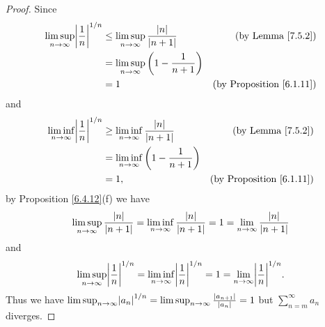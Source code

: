 \begin{proof}
    Since
    \begin{align*}
        \limsup_{n \to \infty} \abs*{\frac{1}{n}}^{1 / n} & \leq \limsup_{n \to \infty} \frac{\abs*{n}}{\abs*{n + 1}} & \text{(by Lemma \ref{7.5.2})}        \\
                                                          & = \limsup_{n \to \infty} \bigg(1 - \frac{1}{n + 1}\bigg)                                         \\
                                                          & = 1                                                       & \text{(by Proposition \ref{6.1.11})}
    \end{align*}
    and
    \begin{align*}
        \liminf_{n \to \infty} \abs*{\frac{1}{n}}^{1 / n} & \geq \liminf_{n \to \infty} \frac{\abs*{n}}{\abs*{n + 1}} & \text{(by Lemma \ref{7.5.2})}        \\
                                                          & = \liminf_{n \to \infty} \bigg(1 - \frac{1}{n + 1}\bigg)                                         \\
                                                          & = 1,                                                      & \text{(by Proposition \ref{6.1.11})}
    \end{align*}
    by Proposition \ref{6.4.12}(f) we have
    \[
        \limsup_{n \to \infty} \frac{\abs*{n}}{\abs*{n + 1}} = \liminf_{n \to \infty} \frac{\abs*{n}}{\abs*{n + 1}} = 1 = \lim_{n \to \infty} \frac{\abs*{n}}{\abs*{n + 1}}
    \]
    and
    \[
        \limsup_{n \to \infty} \abs*{\frac{1}{n}}^{1 / n} = \liminf_{n \to \infty} \abs*{\frac{1}{n}}^{1 / n} = 1 = \lim_{n \to \infty} \abs*{\frac{1}{n}}^{1 / n}.
    \]
    Thus we have \(\limsup_{n \to \infty} \abs*{a_n}^{1 / n} = \limsup_{n \to \infty} \frac{\abs*{a_{n + 1}}}{\abs*{a_n}} = 1\) but \(\sum_{n = m}^\infty a_n\) diverges.


\end{proof}
